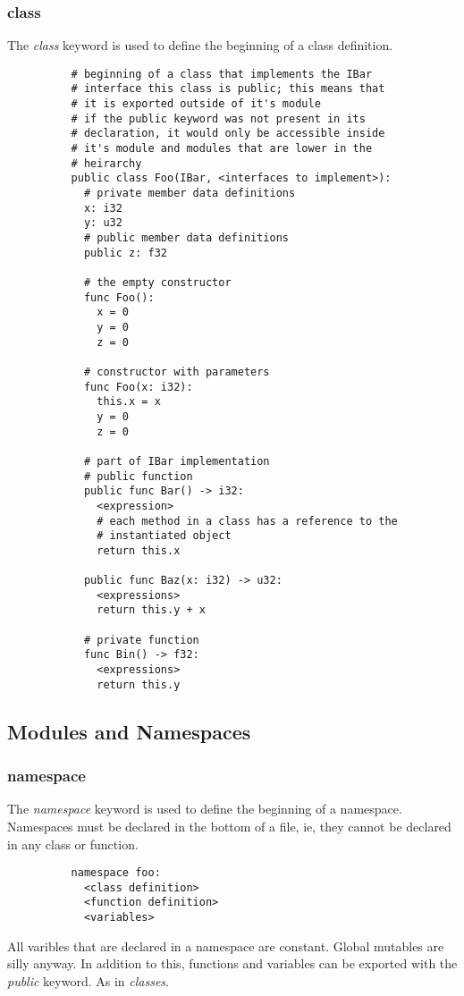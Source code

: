 \documentclass{article}
\newcommand{\subcentersec}[1]{\subsection*{\hfil #1 \hfil}}
\begin{document}
      \subsubsection*{class}
        The \textit{class} keyword is used to define the beginning of a class
        definition.
        \begin{verbatim}
          # beginning of a class that implements the IBar
          # interface this class is public; this means that
          # it is exported outside of it's module
          # if the public keyword was not present in its
          # declaration, it would only be accessible inside
          # it's module and modules that are lower in the
          # heirarchy
          public class Foo(IBar, <interfaces to implement>):
            # private member data definitions
            x: i32
            y: u32
            # public member data definitions
            public z: f32

            # the empty constructor
            func Foo():
              x = 0
              y = 0
              z = 0

            # constructor with parameters
            func Foo(x: i32):
              this.x = x
              y = 0
              z = 0

            # part of IBar implementation
            # public function
            public func Bar() -> i32:
              <expression>
              # each method in a class has a reference to the
              # instantiated object
              return this.x

            public func Baz(x: i32) -> u32:
              <expressions>
              return this.y + x

            # private function
            func Bin() -> f32:
              <expressions>
              return this.y
        \end{verbatim}


    \subcentersec{Modules and Namespaces}
      \subsubsection*{namespace}
        The \textit{namespace} keyword is used to define the beginning of a namespace.
        Namespaces must be declared in the bottom of a file, ie, they cannot be
        declared in any class or function.
        \begin{verbatim}
          namespace foo:
            <class definition>
            <function definition>
            <variables>
        \end{verbatim}
        All varibles that are declared in a namespace are constant. Global mutables
        are silly anyway.
        In addition to this, functions and variables can be exported with the
        \textit{public} keyword. As in \textit{classes}.
\end{document}

